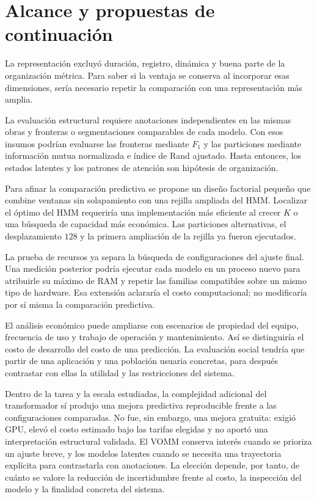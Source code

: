 \section{Alcance y propuestas de continuación}

La representación excluyó duración, registro, dinámica y buena parte de la organización métrica. Para saber si la ventaja se conserva al incorporar esas dimensiones, sería necesario repetir la comparación con una representación más amplia.

La evaluación estructural requiere anotaciones independientes en las mismas obras y fronteras o segmentaciones comparables de cada modelo. Con esos insumos podrían evaluarse las fronteras mediante $F_1$ y las particiones mediante información mutua normalizada e índice de Rand ajustado. Hasta entonces, los estados latentes y los patrones de atención son hipótesis de organización.

Para afinar la comparación predictiva se propone un diseño factorial pequeño que combine ventanas sin solapamiento con una rejilla ampliada del HMM. Localizar el óptimo del HMM requeriría una implementación más eficiente al crecer $K$ o una búsqueda de capacidad más económica. Las particiones alternativas, el desplazamiento $128$ y la primera ampliación de la rejilla ya fueron ejecutados.

La prueba de recursos ya separa la búsqueda de configuraciones del ajuste final. Una medición posterior podría ejecutar cada modelo en un proceso nuevo para atribuirle su máximo de RAM y repetir las familias compatibles sobre un mismo tipo de hardware. Esa extensión aclararía el costo computacional; no modificaría por sí misma la comparación predictiva.

El análisis económico puede ampliarse con escenarios de propiedad del equipo, frecuencia de uso y trabajo de operación y mantenimiento. Así se distinguiría el costo de desarrollo del costo de una predicción. La evaluación social tendría que partir de una aplicación y una población usuaria concretas, para después contrastar con ellas la utilidad y las restricciones del sistema.

Dentro de la tarea y la escala estudiadas, la complejidad adicional del transformador sí produjo una mejora predictiva reproducible frente a las configuraciones comparadas. No fue, sin embargo, una mejora gratuita: exigió GPU, elevó el costo estimado bajo las tarifas elegidas y no aportó una interpretación estructural validada. El VOMM conserva interés cuando se prioriza un ajuste breve, y los modelos latentes cuando se necesita una trayectoria explícita para contrastarla con anotaciones. La elección depende, por tanto, de cuánto se valore la reducción de incertidumbre frente al costo, la inspección del modelo y la finalidad concreta del sistema.
